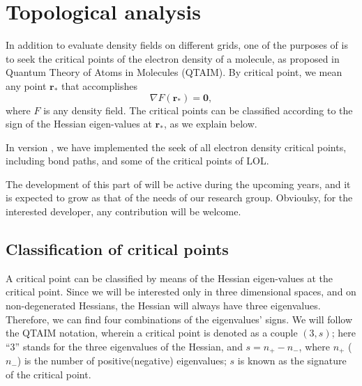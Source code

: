 
\chapter{Topological analysis}\label{sec:topolanalysis}

In addition to evaluate density fields on different grids, one of the purposes of \DTK{} is to seek the critical points of the electron density of a molecule, as proposed in Quantum Theory of Atoms in Molecules (QTAIM). By critical point, we mean any point $\boldsymbol{r}_*$ that accomplishes
%
\begin{equation}
   \nabla F(\boldsymbol{r}_*)=\boldsymbol{0},
\end{equation}
%
where $F$ is any density field. The critical points can be classified according to the sign of the Hessian eigen-values at $\boldsymbol{r}_*$, as we explain below. 

In version \dtkversion, we have implemented the seek of all electron density critical points, including bond paths, and some of the critical points of LOL.

The development of this part of \DTK{} will be active during the upcoming years, and it is expected to grow as that of the needs of our research group. Obvioulsy, for the interested developer, any contribution
will be welcome.

\section{Classification of critical points}

A critical point can be classified by means of the Hessian eigen-values at the critical point.
Since we will be interested only in three dimensional spaces, and on non-degenerated Hessians,
the Hessian will always have three eigenvalues. Therefore, we can find four combinations of
the eigenvalues' signs. We will follow the QTAIM notation, wherein a critical point is
denoted as a couple $(3,s)$; here ``3'' stands for the three eigenvalues of the Hessian, and
$s=n_+-n_-$, where $n_+$ ($n_-$) is the number of positive(negative) eigenvalues; $s$ is
known as the signature of the critical point.

